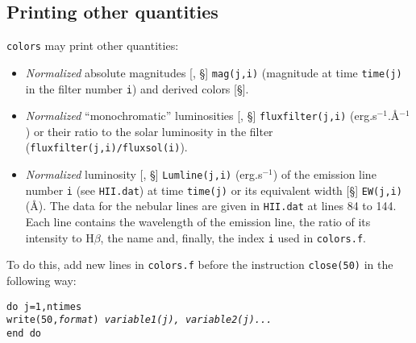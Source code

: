 \documentclass[11pt,draft,fleqn]{article}
\begin{document}
\subsection{Printing other quantities}
\label{colors}
\texttt{colors} may print other quantities:
\begin{itemize}
\item \emph{Normalized} absolute magnitudes [\ddag, \S]
\texttt{mag(j,i)} (magnitude at time
\texttt{time(j)} in the filter number \texttt{i}) and derived colors [\S].
\item \emph{Normalized} ``monochromatic'' luminosities [\dag, \S]
\texttt{fluxfilter(j,i)} (erg.s$^{-1}$.\AA$^{-1}$)
or their ratio to the solar luminosity 
in the filter (\texttt{fluxfilter(j,i)/fluxsol(i)}).
\item \emph{Normalized} luminosity [\dag, \S] \texttt{Lumline(j,i)}
(erg.s$^{-1}$) of the emission line number \texttt{i} (see
\texttt{HII.dat}) at time \texttt{time(j)} 
or its equivalent width [\S] \texttt{EW(j,i)} (\AA).
The data for the nebular lines are given in \texttt{HII.dat} at
lines 84 to 144. Each line contains the wavelength of the emission
line, the ratio of its intensity to H$\beta$, the name and, finally, 
the index \texttt{i} used in \texttt{colors.f}.
\end{itemize}
To do this, add new lines in \texttt{colors.f}
before the instruction \texttt{close(50)} in the following 
way:

\noindent\hspace*{1cm}\texttt{do j=1,ntimes}\\
\hspace*{2cm}\texttt{write(50,\emph{format}) \emph{variable1(j), variable2(j)...}}\\
\hspace*{1cm}\texttt{end do}
\end{document}
